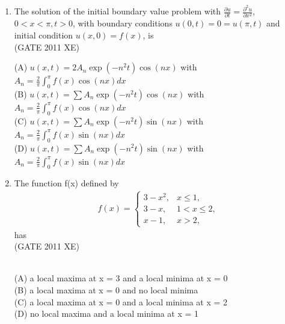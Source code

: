 \documentclass[journal,12pt,onecolumn]{IEEEtran}
\begin{document}
\begin{enumerate}
\hfill{(GATE 2011 XE)} \\
\begin{multicols}{4}
(A) $e_{n+1} = \frac{2}{n} e_n^2$ \\
(B) $e_{n+1} = \frac{1}{2} e_n$ \\
(C) $e_{n+1} = \frac{\sqrt{5}}{2} e_n$ \\
(D) $e_{n+1} = e_n$
\end{multicols}

\item The solution of the initial boundary value problem with $\frac{\partial u}{\partial t} = \frac{\partial^2 u}{\partial x^2}$, $0 < x < \pi, t > 0$, with boundary conditions $u(0,t)=0 = u(\pi, t)$ and initial condition $u(x,0) = f(x)$, is \\

\hfill{(GATE 2011 XE)} \\
\begin{multicols}{2}
(A) $u(x,t) = 2 A_n \exp(-n^2 t) \cos(nx)$ with $A_n = \frac{2}{\pi} \int_0^{\pi} f(x) \cos(nx) dx$ \\
(B) $u(x,t) = \sum A_n \exp(-n^2 t) \cos(nx)$ with $A_n = \frac{2}{\pi} \int_0^{\pi} f(x) \cos(nx) dx$ \\
(C) $u(x,t) = \sum A_n \exp(-n^2 t) \sin(nx)$ with $A_n = \frac{2}{\pi} \int_0^{\pi} f(x) \sin(nx) dx$ \\
(D) $u(x,t) = \sum A_n \exp(-n^2 t) \sin(nx)$ with $A_n = \frac{2}{\pi} \int_0^{\pi} f(x) \sin(nx) dx$
\end{multicols}

\item The function f(x) defined by
\begin{align} 
f(x) = 
\begin{cases} 
3 - x^2, & x \leq 1, \\
3 - x, & 1 < x \leq 2, \\
x - 1, & x > 2,
\end{cases}
\end{align}
has\\ 

\hfill{(GATE 2011 XE)} \\\
\begin{multicols}{2}
(A) a local maxima at x = 3 and a local minima at x = 0 \\
(B) a local maxima at x = 0 and no local minima \\ 
(C) a local maxima at x = 0 and a local minima at x = 2 \\
(D) no local maxima and a local minima at x = 1
\end{multicols}



\end{enumerate}
\end{document}
